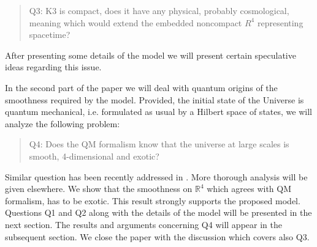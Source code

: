 \documentclass[12pt]{article}
\begin{document}
\begin{quotation}
Q3: K3 is compact, does it have any physical, probably cosmological, meaning which would extend the embedded noncompact $R^4$ representing spacetime?
\end{quotation}
After presenting some details of the model we will present certain speculative ideas regarding this issue.

In the second part of the paper we will deal with quantum origins of the smoothness required by the model. Provided, the initial state of the Universe is quantum mechanical, i.e. formulated as usual by a Hilbert space of states, we will analyze the following problem:
\begin{quotation}
Q4: Does the QM formalism know that the universe at large scales is smooth, 4-dimensional and exotic? 
\end{quotation}
Similar question has been recently addressed in \cite{JKuniverse17,JK2017a}. More thorough analysis will be given elsewhere. We show that the smoothness on $\mathbb{R}^4$ which agrees with QM formalism, has to be exotic. This result strongly supports the proposed model. Questions Q1 and Q2 along with the details of the model will be presented in the next section. The results and arguments concerning Q4 will appear in the subsequent section. We close the paper with the discussion which covers also Q3.
\end{document}
